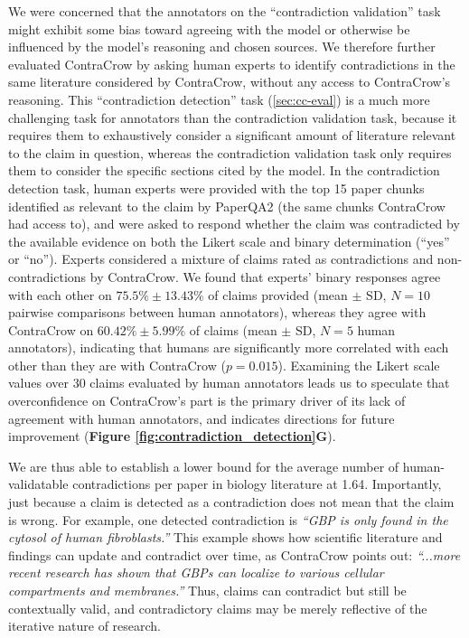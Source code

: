 \documentclass{article}
\begin{document}
\begin{bibunit}[unsrt]
We were concerned that the annotators on the ``contradiction validation'' task might exhibit some bias toward agreeing with the model or otherwise be influenced by the model's reasoning and chosen sources. We therefore further evaluated ContraCrow by asking human experts to identify contradictions in the same literature considered by ContraCrow, without any access to ContraCrow's reasoning. This ``contradiction detection'' task (\autoref{sec:cc-eval}) is a much more challenging task for annotators than the contradiction validation task, because it requires them to exhaustively consider a significant amount of literature relevant to the claim in question, whereas the contradiction validation task only requires them to consider the specific sections cited by the model. In the contradiction detection task, human experts were provided with the top 15 paper chunks identified as relevant to the claim by PaperQA2 (the same chunks ContraCrow had access to), and were asked to respond whether the claim was contradicted by the available evidence on both the Likert scale and binary determination (``yes'' or ``no''). Experts considered a mixture of claims rated as contradictions and non-contradictions by ContraCrow. We found that experts' binary responses agree with each other on $75.5\% \pm 13.43\%$ of claims provided (mean $\pm$ SD, $N=10$ pairwise comparisons between human annotators), whereas they agree with ContraCrow on $60.42\% \pm 5.99 \%$ of claims (mean $\pm$ SD, $N=5$ human annotators), indicating that humans are significantly more correlated with each other than they are with ContraCrow ($p=0.015$). Examining the Likert scale values over 30 claims evaluated by human annotators leads us to speculate that overconfidence on ContraCrow's part is the primary driver of its lack of agreement with human annotators, and indicates directions for future improvement (\textbf{Figure \ref{fig:contradiction_detection}G}).

We are thus able to establish a lower bound for the average number of human-validatable contradictions per paper in biology literature at 1.64. Importantly, just because a claim is detected as a contradiction does not mean that the claim is wrong. For example, one detected contradiction is \textit{``GBP is only found in the cytosol of human fibroblasts.''}\cite{cheng1985affinity} This example shows how scientific literature and findings can update and contradict over time, as ContraCrow points out: \textit{``...more recent research has shown that GBPs can localize to various cellular compartments and membranes\cite{britzen2010intracellular, modiano2005golgi, naschberger2006human, schelle2023functional}.''} Thus, claims can contradict but still be contextually valid, and contradictory claims may be merely reflective of the iterative nature of research.


\end{bibunit}
\end{document}
